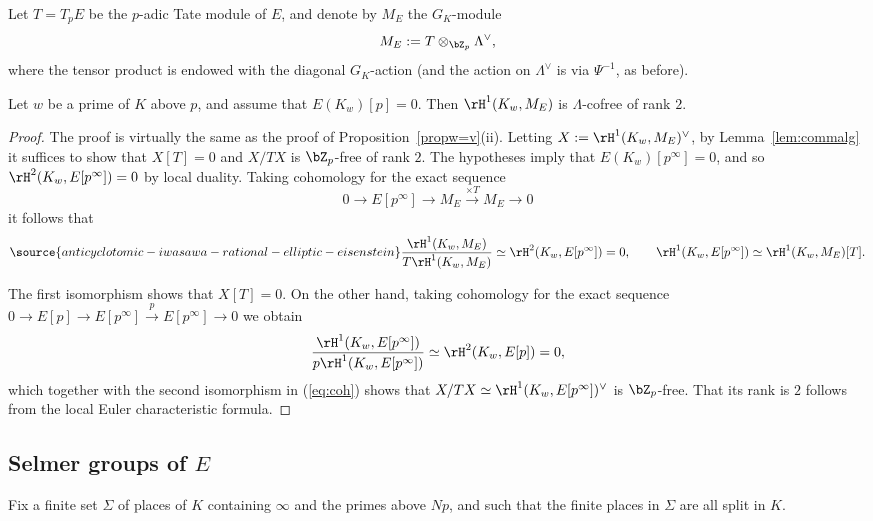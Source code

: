 Let $T=T_pE$ be the $p$-adic Tate module of $E$, and denote by $M_E$ the $G_K$-module
\[
M_E:=T\otimes_{\bZ_p}\Lambda^\vee,
\]
where the tensor product is endowed with the diagonal $G_K$-action (and the action on $\Lambda^\vee$ is via $\Psi^{-1}$, as before).


\begin{lemma}
\notready\label{lemma411}
Let $w$ be a prime of $K$ above $p$, and assume that $E(K_w)[p]=0$. Then $\rH^1(K_w,M_E)$ is $\Lambda$-cofree of rank $2$.
\end{lemma}

\begin{proof}
The proof is virtually the same as the proof of Proposition~\ref{propw=v}(ii). Letting $X:=\rH^1(K_w,M_E)^\vee$, by Lemma~\ref{lem:commalg} it suffices to show that $X[T]=0$ and $X/TX$ is $\bZ_p$-free of rank $2$. The hypotheses imply that $E(K_w)[p^\infty]=0$, and so $\rH^2(K_w,E[p^\infty])=0$ by local duality. Taking cohomology for the exact sequence
\[
0\rightarrow E[p^\infty]\rightarrow M_E\xrightarrow{\times T}M_E\rightarrow 0
\]
it follows that
\begin{equation}\label{eq:coh}
\source{anticyclotomic-iwasawa-rational-elliptic-eisenstein}
\frac{\rH^1(K_w,M_E)}{T\rH^1(K_w,M_E)}\simeq\rH^2(K_w,E[p^\infty])=0,\quad
\quad\rH^1(K_w,E[p^\infty])\simeq\rH^1(K_w,M_E)[T].
\end{equation}

The first isomorphism shows that $X[T]=0$. On the other hand, taking cohomology for the exact sequence $0\rightarrow E[p]\rightarrow E[p^\infty]\xrightarrow{p}E[p^\infty]\rightarrow 0$ we obtain
\[
\frac{\rH^1(K_w,E[p^\infty])}{p\rH^1(K_w,E[p^\infty])}\simeq\rH^2(K_w,E[p])=0,
\]
which together with the second isomorphism in (\ref{eq:coh}) shows that $X/TX\simeq\rH^1(K_w,E[p^\infty])^\vee$ is $\bZ_p$-free. That its rank is $2$ follows from the local Euler characteristic formula.
\end{proof}


\subsection{Selmer groups of \texorpdfstring{$E$}{E}}
\label{subsec:Sel-E}

Fix a finite set $\Sigma$ of places of $K$ containing $\infty$ and the primes above $Np$, and such that the finite places in $\Sigma$ are all split in $K$.

